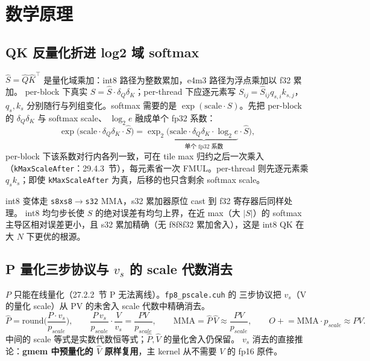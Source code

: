 \section{数学原理}

\subsection{QK 反量化折进 log2 域 softmax}\label{sec:29-qk-fold}

$\hat S=\hat Q\hat K^{\top}$ 是量化域乘加：int8 路径为整数累加，e4m3 路径为浮点乘加以 f32 累加。
per-block 下真实 $S=\hat S\cdot\delta_Q\delta_K$；per-thread 下应逐元素写
$S_{ij}=\hat S_{ij}q_{s,i}k_{s,j}$，$q_s,k_s$ 分别随行与列组变化。softmax 需要的是
$\exp(\mathrm{scale}\cdot S)$。先把 per-block 的 $\delta_Q\delta_K$ 与 softmax scale、
$\log_2 e$ 融成单个 fp32 系数：
\begin{equation}
  \exp\big(\mathrm{scale}\cdot\delta_Q\delta_K\cdot\hat S\big)
  =\exp_2\!\big(\underbrace{\mathrm{scale}\cdot\delta_Q\delta_K\cdot\log_2 e}_{\text{单个
  fp32 系数}}\cdot\hat S\big),
  \label{eq:29-sdequant}
\end{equation}
per-block 下该系数对行内各列一致，可在 tile max 归约之后一次乘入
（\texttt{kMaxScaleAfter}：29.4.3~节），每元素省一次 FMUL。per-thread 则先逐元素乘
$q_s k_s$；即使 \texttt{kMaxScaleAfter} 为真，后移的也只含剩余 softmax scale。

int8 变体走 \texttt{s8xs8$\to$s32} MMA，s32 累加器原位 cast 到 f32 寄存器后同样处理。
int8 均匀步长使 $S$ 的绝对误差有均匀上界，在近 max（大 $|S|$）的 softmax
主导区相对误差更小，且 s32 累加精确（无 f8f8f32 累加舍入），这是 int8 QK 在
大 $N$ 下更优的根源。

\subsection{P 量化三步协议与 $v_s$ 的 scale 代数消去}\label{sec:29-pscale}

$P$ 只能在线量化（27.2.2~节 P 无法离线）。\texttt{fp8\_pscale.cuh} 的
三步协议把 $v_s$（V 的量化 scale）从 PV 的未舍入 scale 代数中精确消去。
\begin{equation}
  \hat P=\mathrm{round}\!\Big(\frac{P\cdot v_s}{p_{scale}}\Big),\qquad
  \frac{P\,v_s}{p_{scale}}\cdot\frac{V}{v_s}=\frac{PV}{p_{scale}},\qquad
  \mathrm{MMA}=\hat P\,\hat V\approx\frac{PV}{p_{scale}},\qquad
  O\mathrel{+}=\mathrm{MMA}\cdot p_{scale} \approx PV .
  \label{eq:29-threestep}
\end{equation}
中间的 scale 等式是实数代数恒等式；$\hat P,\hat V$ 的量化舍入仍保留。
$v_s$ 消去的直接推论：\textbf{gmem 中预量化的 $\hat V$ 原样复用}，主 kernel
从不需要 $V$ 的 fp16 原件。

